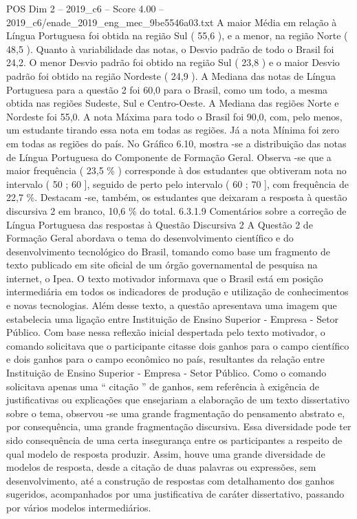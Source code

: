 \begin{textsample}{POS Dim 2 – 2019\_c6 – Score 4.00 – 2019\_c6/enade\_2019\_eng\_mec\_9be5546a03.txt}
A maior Média em relação à Língua Portuguesa foi obtida na região Sul ( 55,6 ), e a menor, na região Norte ( 48,5 ).
Quanto à variabilidade das notas, o Desvio padrão de todo o Brasil foi 24,2.
O menor Desvio padrão foi obtido na região Sul ( 23,8 ) e o maior Desvio padrão foi obtido na região Nordeste ( 24,9 ).
A Mediana das notas de Língua Portuguesa para a questão 2 foi 60,0 para o Brasil, como um todo, a mesma obtida nas regiões Sudeste, Sul e Centro-Oeste.
A Mediana das regiões Norte e Nordeste foi 55,0.
A nota Máxima para todo o Brasil foi 90,0, com, pelo menos, um estudante tirando essa nota em todas as regiões.
Já a nota Mínima foi zero em todas as regiões do país.
No Gráfico 6.10, mostra -se a distribuição das notas de Língua Portuguesa do Componente de Formação Geral.
Observa -se que a maior frequência ( 23,5 \% ) corresponde à dos estudantes que obtiveram nota no intervalo ( 50 ; 60 ], seguido de perto pelo intervalo ( 60 ; 70 ], com frequência de 22,7 \%.
Destacam -se, também, os estudantes que deixaram a resposta à questão discursiva 2 em branco, 10,6 \% do total. 6.3.1.9 Comentários sobre a correção de Língua Portuguesa das respostas à Questão Discursiva 2 A Questão 2 de Formação Geral abordava o tema do desenvolvimento científico e do desenvolvimento tecnológico do Brasil, tomando como base um fragmento de texto publicado em site oficial de um órgão governamental de pesquisa na internet, o Ipea.
O texto motivador informava que o Brasil está em posição intermediária em todos os indicadores de produção e utilização de conhecimentos e novas tecnologias.
Além desse texto, a questão apresentava uma imagem que estabelecia uma ligação entre Instituição de Ensino Superior - Empresa - Setor Público.
Com base nessa reflexão inicial despertada pelo texto motivador, o comando solicitava que o participante citasse dois ganhos para o campo científico e dois ganhos para o campo econômico no país, resultantes da relação entre Instituição de Ensino Superior - Empresa - Setor Público.
Como o comando solicitava apenas uma “ citação ” de ganhos, sem referência à exigência de justificativas ou explicações que ensejariam a elaboração de um texto dissertativo sobre o tema, observou -se uma grande fragmentação do pensamento abstrato e, por consequência, uma grande fragmentação discursiva.
Essa diversidade pode ter sido consequência de uma certa insegurança entre os participantes a respeito de qual modelo de resposta produzir.
Assim, houve uma grande diversidade de modelos de resposta, desde a citação de duas palavras ou expressões, sem desenvolvimento, até a construção de respostas com detalhamento dos ganhos sugeridos, acompanhados por uma justificativa de caráter dissertativo, passando por vários modelos intermediários.

\end{textsample}
